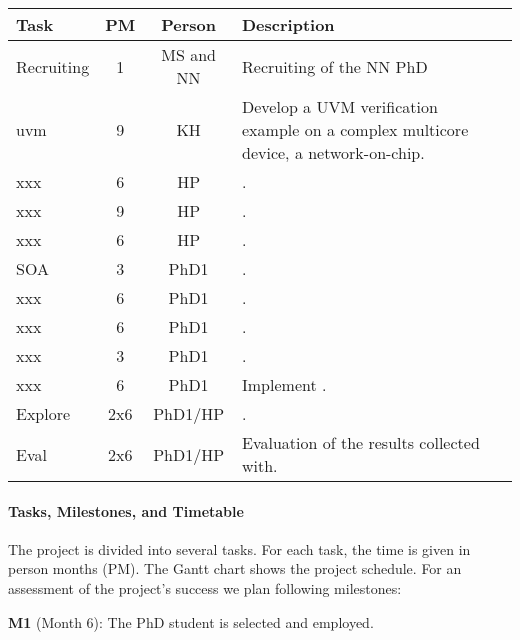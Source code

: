 \documentclass[fleqn,12pt]{article}
\begin{document}
\begin{table*}%
{\small
  \begin{center}
    \begin{tabular}{lccp{110mm}l}
      \toprule
      Task          & PM  & Person &  Description \\
      \midrule
      Recruiting  & 1 & MS and NN & Recruiting of the NN PhD \\
      \midrule
      uvm     &  9      & KH     & Develop a UVM verification example on a complex multicore device, a network-on-chip.\\
      xxx     &  6      & HP     & .\\
      xxx    &  9      & HP     & .\\
      xxx     &  6      & HP     & .\\
      \midrule
      SOA  & 3      & PhD1     &  . \\
      xxx  & 6      & PhD1     &  . \\
      xxx  & 6      & PhD1     &  . \\
      xxx  & 3      & PhD1     &  . \\
      xxx  & 6      & PhD1     &  Implement . \\
      \midrule
      Explore   &    2x6 & PhD1/HP    &  .\\
      Eval & 2x6 & PhD1/HP & Evaluation of the results collected with. \\
      \bottomrule
    \end{tabular}
  \end{center}
}
\end{table*}

\paragraph*{Tasks, Milestones, and Timetable}

The project is divided into several tasks.
For each task, the time is given in person months (PM). The Gantt chart shows
the project schedule.
For an assessment of the project's success we plan following milestones:

\textbf{M1} (Month 6): The PhD student is selected and employed.
\end{document}
